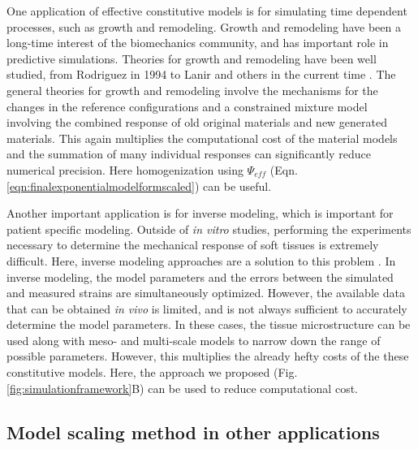     One application of effective constitutive models is for simulating time dependent processes, such as growth and remodeling. Growth and remodeling have been a long-time interest of the biomechanics community, and has important role in predictive simulations. Theories for growth and remodeling have been well studied, from Rodriguez in 1994 to Lanir and others in the current time \cite{lanir_mechanistic_2014, gleason_mixture_2004, rodriguez_stress_1994, humphrey_constrained_2002, cowin_tissue_2004, taber_biomechanics_1995}. The general theories for growth and remodeling involve the mechanisms for the changes in the reference configurations and a constrained mixture model involving the combined response of old original materials and new generated materials. This again multiplies the computational cost of the material models and the summation of many individual responses can significantly reduce numerical precision. Here homogenization using $\Psi_{eff}$ (Eqn. \ref{eqn:finalexponentialmodelformscaled}) can be useful. 
    

    Another important application is for inverse modeling, which is important for patient specific modeling. Outside of \textit{in vitro} studies, performing the experiments necessary to determine the mechanical response of soft tissues is extremely difficult. Here, inverse modeling approaches are a solution to this problem \cite{lee_inverse_2014, aggarwal_inverse_2015, aggarwal_patient_2013, kim_inverse_2009, liu_inverse_2013}. In inverse modeling, the model parameters and the errors between the simulated and measured strains are simultaneously optimized. However, the available data that can be obtained \textit{in vivo} is limited, and is not always sufficient to accurately determine the model parameters. In these cases, the tissue microstructure can be used along with meso- and multi-scale models to narrow down the range of possible parameters. However, this multiplies the already hefty costs of the these constitutive models. Here, the approach we proposed (Fig. \ref{fig:simulationframework}B) can be used to reduce computational cost.

 



\subsection{Model scaling method in other applications}
    
